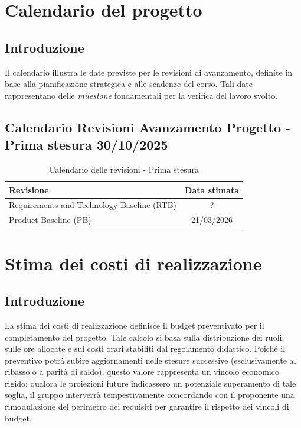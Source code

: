 \documentclass[a4paper, 11pt, oneside]{scrartcl} %
\begin{document}
\newpage
\section{Calendario del progetto}

\subsection{Introduzione}
Il calendario illustra le date previste per le revisioni di avanzamento, definite in base alla pianificazione strategica e alle scadenze del corso. Tali date rappresentano delle \textit{milestone} fondamentali per la verifica del lavoro svolto.

\subsection{Calendario Revisioni Avanzamento Progetto - Prima stesura 30/10/2025}

\begin{table}[!ht]
\centering
\renewcommand{\arraystretch}{1.5}
\begin{tabularx}{0.8\textwidth}{L c}
\toprule
\textbf{Revisione} & \textbf{Data stimata} \\
\midrule
Requirements and Technology Baseline{\scriptsize{}} (RTB) & ? \\
\midrule
Product Baseline (PB) & 21/03/2026 \\
\bottomrule
\end{tabularx}
\caption{Calendario delle revisioni - Prima stesura}
\end{table}

\newpage
\section{Stima dei costi di realizzazione}

\subsection{Introduzione}
La stima dei costi di realizzazione definisce il budget preventivato per il completamento del progetto. Tale calcolo si basa sulla distribuzione dei ruoli, sulle ore allocate e sui costi orari stabiliti dal regolamento didattico.
Poiché il preventivo{\scriptsize{}} potrà subire aggiornamenti nelle stesure successive (esclusivamente al ribasso o a parità di saldo), questo valore rappresenta un vincolo economico rigido: qualora le proiezioni future indicassero un potenziale superamento di tale soglia, il gruppo interverrà tempestivamente concordando con il proponente una rimodulazione del perimetro dei requisiti per garantire il rispetto dei vincoli di budget.
\end{document}
